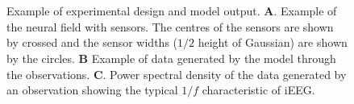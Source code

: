 \documentclass[12pt]{iopart}
\begin{document}
\begin{figure}[!hb]
\centering
{}\\
\\
\caption{Example of experimental design and model output. \textbf{A}. Example of the neural field with sensors. The centres of the sensors are shown by crossed and the sensor widths ($1/2$ height of Gaussian) are shown by the circles. \textbf{B} Example of data generated by the model through the observations. \textbf{C}. Power spectral density of the data generated by an observation showing the typical $1/f$ characteristic of iEEG.} \label{fig:experimental design} 
\end{figure}
\end{document}
